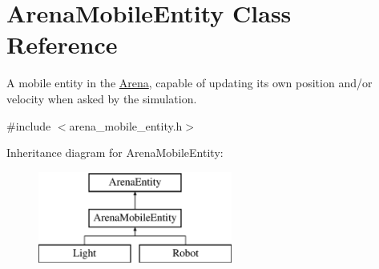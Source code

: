 \hypertarget{class_arena_mobile_entity}{}\section{Arena\+Mobile\+Entity Class Reference}
\label{class_arena_mobile_entity}


A mobile entity in the \mbox{\hyperlink{class_arena}{Arena}}, capable of updating its own position and/or velocity when asked by the simulation.  




{\ttfamily \#include $<$arena\+\_\+mobile\+\_\+entity.\+h$>$}

Inheritance diagram for Arena\+Mobile\+Entity\+:\begin{figure}[H]
\begin{center}
\leavevmode
\includegraphics[height=3.000000cm]{class_arena_mobile_entity}
\end{center}
\end{figure}
